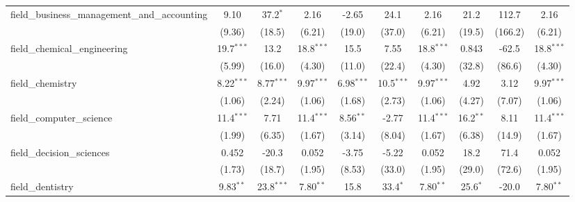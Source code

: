\begin{tabular}{lccccccccc}
   field\_business\_management\_and\_accounting                & 9.10          & 37.2$^{*}$    & 2.16          & -2.65         & 24.1           & 2.16          & 21.2          & 112.7          & 2.16\\   
                                                               & (9.36)        & (18.5)        & (6.21)        & (19.0)        & (37.0)         & (6.21)        & (19.5)        & (166.2)        & (6.21)\\   
   field\_chemical\_engineering                                & 19.7$^{***}$  & 13.2          & 18.8$^{***}$  & 15.5          & 7.55           & 18.8$^{***}$  & 0.843         & -62.5          & 18.8$^{***}$\\   
                                                               & (5.99)        & (16.0)        & (4.30)        & (11.0)        & (22.4)         & (4.30)        & (32.8)        & (86.6)         & (4.30)\\   
   field\_chemistry                                            & 8.22$^{***}$  & 8.77$^{***}$  & 9.97$^{***}$  & 6.98$^{***}$  & 10.5$^{***}$   & 9.97$^{***}$  & 4.92          & 3.12           & 9.97$^{***}$\\   
                                                               & (1.06)        & (2.24)        & (1.06)        & (1.68)        & (2.73)         & (1.06)        & (4.27)        & (7.07)         & (1.06)\\   
   field\_computer\_science                                    & 11.4$^{***}$  & 7.71          & 11.4$^{***}$  & 8.56$^{**}$   & -2.77          & 11.4$^{***}$  & 16.2$^{**}$   & 8.11           & 11.4$^{***}$\\   
                                                               & (1.99)        & (6.35)        & (1.67)        & (3.14)        & (8.04)         & (1.67)        & (6.38)        & (14.9)         & (1.67)\\   
   field\_decision\_sciences                                   & 0.452         & -20.3         & 0.052         & -3.75         & -5.22          & 0.052         & 18.2          & 71.4           & 0.052\\   
                                                               & (1.73)        & (18.7)        & (1.95)        & (8.53)        & (33.0)         & (1.95)        & (29.0)        & (72.6)         & (1.95)\\   
   field\_dentistry                                            & 9.83$^{**}$   & 23.8$^{***}$  & 7.80$^{**}$   & 15.8          & 33.4$^{*}$     & 7.80$^{**}$   & 25.6$^{*}$    & -20.0          & 7.80$^{**}$\\   

\end{tabular}

